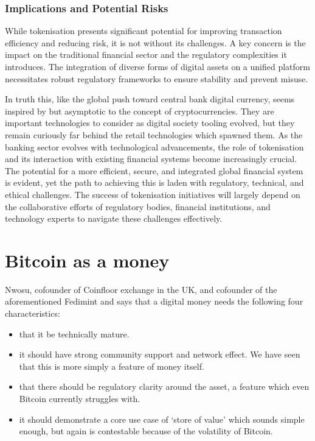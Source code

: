 \subsubsection{Implications and Potential Risks}
While tokenisation presents significant potential for improving transaction efficiency and reducing risk, it is not without its challenges. A key concern is the impact on the traditional financial sector and the regulatory complexities it introduces. The integration of diverse forms of digital assets on a unified platform necessitates robust regulatory frameworks to ensure stability and prevent misuse.\par
In truth this, like the global push toward central bank digital currency, seems inspired by but asymptotic to the concept of cryptocurrencies. They are important technologies to consider as digital society tooling evolved, but they remain curiously far behind the retail technologies which spawned them. As the banking sector evolves with technological advancements, the role of tokenisation and its interaction with existing financial systems become increasingly crucial. The potential for a more efficient, secure, and integrated global financial system is evident, yet the path to achieving this is laden with regulatory, technical, and ethical challenges. The success of tokenisation initiatives will largely depend on the collaborative efforts of regulatory bodies, financial institutions, and technology experts to navigate these challenges effectively.


\section{Bitcoin as a money}
Nwosu, cofounder of Coinfloor exchange in the UK, and cofounder of the aforementioned Fedimint and says that a digital money needs the following four characteristics:
\begin{itemize}
\item that it be technically mature. %
\item it should have strong community support and network effect. We have seen that this is more simply a feature of money itself.
\item that there should be regulatory clarity around the asset, a feature which even Bitcoin currently struggles with.
\item it should demonstrate a core use case of `store of value' which sounds simple enough, but again is contestable because of the volatility of Bitcoin.
\end{itemize}
